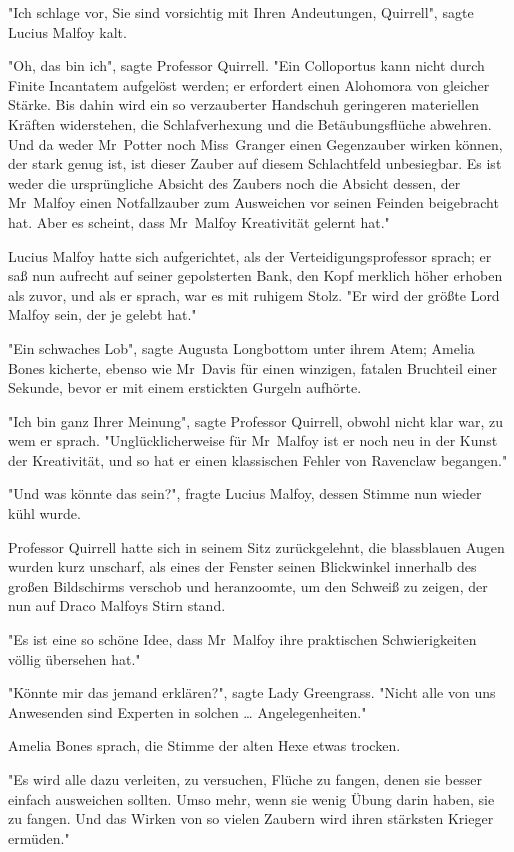{"Ich schlage vor, Sie sind vorsichtig mit Ihren Andeutungen, Quirrell", sagte Lucius Malfoy kalt.

"Oh, das bin ich", sagte Professor Quirrell. "Ein Colloportus kann nicht durch Finite Incantatem aufgelöst werden; er erfordert einen Alohomora von gleicher Stärke. Bis dahin wird ein so verzauberter Handschuh geringeren materiellen Kräften widerstehen, die Schlafverhexung und die Betäubungsflüche abwehren. Und da weder Mr~Potter noch Miss~Granger einen Gegenzauber wirken können, der stark genug ist, ist dieser Zauber auf diesem Schlachtfeld unbesiegbar. Es ist weder die ursprüngliche Absicht des Zaubers noch die Absicht dessen, der Mr~Malfoy einen Notfallzauber zum Ausweichen vor seinen Feinden beigebracht hat. Aber es scheint, dass Mr~Malfoy Kreativität gelernt hat."

Lucius Malfoy hatte sich aufgerichtet, als der Verteidigungsprofessor sprach; er saß nun aufrecht auf seiner gepolsterten Bank, den Kopf merklich höher erhoben als zuvor, und als er sprach, war es mit ruhigem Stolz. "Er wird der größte Lord Malfoy sein, der je gelebt hat."

"Ein schwaches Lob", sagte Augusta Longbottom unter ihrem Atem; Amelia Bones kicherte, ebenso wie Mr~Davis für einen winzigen, fatalen Bruchteil einer Sekunde, bevor er mit einem erstickten Gurgeln aufhörte.

"Ich bin ganz Ihrer Meinung", sagte Professor Quirrell, obwohl nicht klar war, zu wem er sprach. "Unglücklicherweise für Mr~Malfoy ist er noch neu in der Kunst der Kreativität, und so hat er einen klassischen Fehler von Ravenclaw begangen."

"Und was könnte das sein?", fragte Lucius Malfoy, dessen Stimme nun wieder kühl wurde.

Professor Quirrell hatte sich in seinem Sitz zurückgelehnt, die blassblauen Augen wurden kurz unscharf, als eines der Fenster seinen Blickwinkel innerhalb des großen Bildschirms verschob und heranzoomte, um den Schweiß zu zeigen, der nun auf Draco Malfoys Stirn stand.

"Es ist eine so schöne Idee, dass Mr~Malfoy ihre praktischen Schwierigkeiten völlig übersehen hat."

"Könnte mir das jemand erklären?", sagte Lady Greengrass. "Nicht alle von uns Anwesenden sind Experten in solchen … Angelegenheiten."

Amelia Bones sprach, die Stimme der alten Hexe etwas trocken.

"Es wird alle dazu verleiten, zu versuchen, Flüche zu fangen, denen sie besser einfach ausweichen sollten. Umso mehr, wenn sie wenig Übung darin haben, sie zu fangen. Und das Wirken von so vielen Zaubern wird ihren stärksten Krieger ermüden."

}
